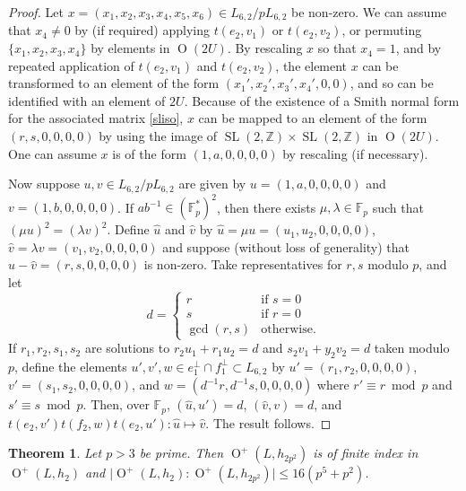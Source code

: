 \documentclass[11pt]{amsart}
\newtheorem{thm}{Theorem}[section]
\newcommand{\ZZ}{\mathbb{Z}}
\newcommand{\FF}{\mathbb{F}}
\newcommand{\opn}{\operatorname}
\begin{document}
\begin{proof}
Let $x = (x_1, x_2, x_3, x_4, x_5, x_6) \in L_{6,2} / p L_{6,2}$ be non-zero. 
We can assume that $x_4 \neq 0$ by (if required) applying $t(e_2, v_1)$ or $t(e_2, v_2)$, or permuting $\{x_1, x_2, x_3, x_4 \}$ by elements in $\opn{O}(2U)$. 
By rescaling $x$ so that $x_4 = 1$, and by repeated application of $t(e_2, v_1)$ and $t(e_2, v_2)$, the element $x$ can be transformed to an element of the form $(x_1',x_2',x_3',x_4', 0, 0)$, and so can be identified with an element of $2U$. 
Because of the existence of a Smith normal form for the associated matrix \eqref{sliso}, $x$ can be mapped to an element of the form $(r, s, 0,0,0,0)$ by using the image of $\opn{SL}(2, \ZZ) \times \opn{SL}(2, \ZZ)$ in $\opn{O}(2U)$.
One can assume $x$ is of the form $(1, a, 0,0,0,0)$ by rescaling (if necessary).

Now suppose $u, v \in L_{6,2} / p L_{6,2}$ are given by $u=(1, a, 0,0,0,0)$ and $v=(1, b, 0,0,0,0)$.
If $ab^{-1} \in (\FF_p^*)^2$, then there exists $\mu, \lambda \in \FF_p$ such that $(\mu u)^2 = (\lambda v)^2$.  
Define $\hat{u}$ and $\hat{v}$ by $\hat{u}=\mu u = (u_1, u_2, 0,0,0,0)$, $\hat{v}=\lambda v = (v_1, v_2, 0,0,0,0)$ and suppose (without loss of generality) that $\hat{u} - \hat{v} = (r,s,0,0,0,0)$ is non-zero.
Take representatives for $r,s$ modulo $p$, and let
\begin{equation*}
d = 
\begin{cases}
r & \text{if $s=0$}\\
s & \text{if $r=0$} \\
\opn{gcd}(r,s) & \text{otherwise}.
\end{cases}
\end{equation*}
If $r_1, r_2, s_1, s_2$ are solutions to $r_2 u_1 + r_1 u_2 = d$ and  $s_2 v_1 + y_2 v_2 = d$ taken modulo $p$, define the elements $u', v', w \in e_1^{\perp} \cap f_1^{\perp} \subset L_{6,2}$  by $u'=(r_1, r_2, 0,0,0,0)$, $v'=(s_1, s_2, 0,0,0,0)$, and $w=(d^{-1}r, d^{-1}s, 0,0,0,0)$ where $r' \equiv r \bmod{p}$ and $s' \equiv s \bmod{p}$.
Then, over $\FF_p$, $(\hat{u}, u') = d$, $(\hat{v}, v) = d$, and $t(e_2, v')t(f_2, w)t(e_2, u'): \hat{u} \mapsto \hat{v}$.
The result follows. 
\end{proof}
\begin{thm}\label{finindexthm}
Let $p>3$ be prime.
Then $\opn{O}^+(L, h_{2p^2})$ is of finite index in $\opn{O}^+(L , h_2)$ and   
$\vert  \opn{O}^+(L , h_2) : \opn{O}^+(L , h_{2p^2}) \vert \leq 16 (p^5 + p^2)$.
\end{thm}
\end{document}
